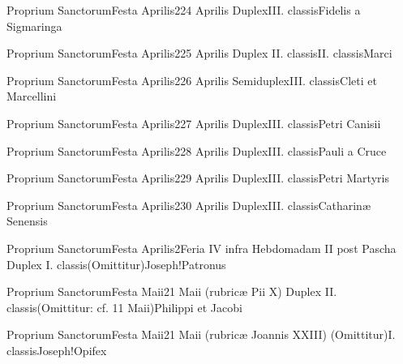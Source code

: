 \documentclass[invitatoriale-romanum.tex]{subfiles}
\begin{document}
	{Proprium Sanctorum}{Festa Aprilis}{2}{24 Aprilis}
	{Duplex}{III. classis}{Fidelis a Sigmaringa}
	{}
	{}

	{Proprium Sanctorum}{Festa Aprilis}{2}{25 Aprilis}
	{Duplex II. classis}{II. classis}{Marci}
	{}
	{}

	{Proprium Sanctorum}{Festa Aprilis}{2}{26 Aprilis}
	{Semiduplex}{III. classis}{Cleti et Marcellini}
	{}
	{}

	{Proprium Sanctorum}{Festa Aprilis}{2}{27 Aprilis}
	{Duplex}{III. classis}{Petri Canisii}
	{}
	{}

	{Proprium Sanctorum}{Festa Aprilis}{2}{28 Aprilis}
	{Duplex}{III. classis}{Pauli a Cruce}
	{}
	{}

	{Proprium Sanctorum}{Festa Aprilis}{2}{29 Aprilis}
	{Duplex}{III. classis}{Petri Martyris}
	{}
	{}

	{Proprium Sanctorum}{Festa Aprilis}{2}{30 Aprilis}
	{Duplex}{III. classis}{Catharinæ Senensis}
	{}
	{}

\newpage

	{Proprium Sanctorum}{Festa Aprilis}{2}{Feria IV infra Hebdomadam II post Pascha}
	{Duplex I. classis}{(Omittitur)}{Joseph!Patronus}
	{}
	{}


	{Proprium Sanctorum}{Festa Maii}{2}{1 Maii (rubricæ Pii X)}
	{Duplex II. classis}{(Omittitur: cf. 11 Maii)}{Philippi et Jacobi}
	{}
	{}

	{Proprium Sanctorum}{Festa Maii}{2}{1 Maii (rubricæ Joannis XXIII)}
	{(Omittitur)}{I. classis}{Joseph!Opifex}
	{}
	{}
\end{document}

